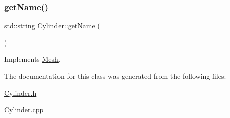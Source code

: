 \subsubsection{\texorpdfstring{getName()}{getName()}}
{\footnotesize\ttfamily std\+::string Cylinder\+::get\+Name (\begin{DoxyParamCaption}{ }\end{DoxyParamCaption})\hspace{0.3cm}{\ttfamily [virtual]}}



Implements \mbox{\hyperlink{class_mesh_aa131fe1c2586fe60988155db77c57272}{Mesh}}.



The documentation for this class was generated from the following files\+:\begin{DoxyCompactItemize}
\item 
\mbox{\hyperlink{_cylinder_8h}{Cylinder.\+h}}\item 
\mbox{\hyperlink{_cylinder_8cpp}{Cylinder.\+cpp}}\end{DoxyCompactItemize}
